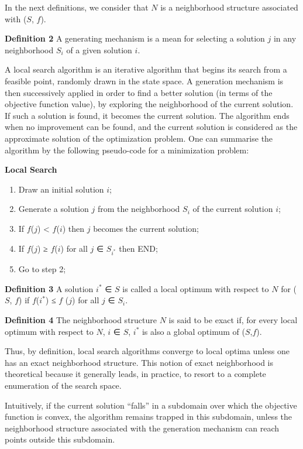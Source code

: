 \documentclass[conference]{IEEEtran}
\begin{document}
In the next definitions, we consider that $N$ is a neighborhood structure associated with ($S$, $f$).

\textbf{Definition 2} A generating mechanism is a mean for selecting a solution $j$ in any neighborhood $S_{i}$ of a given solution $i$.

A local search algorithm is an iterative algorithm that begins its search from a feasible point, randomly drawn in the state space. A generation mechanism is then successively applied in order to find a better solution (in terms of the objective function value), by exploring the neighborhood of the current solution. If such a solution is found, it becomes the current solution. The algorithm ends when no improvement can be found, and the current solution is considered as the approximate solution of the optimization problem. One can summarise the algorithm by the following pseudo-code for a minimization problem:

\textbf{Local Search}

\begin{enumerate}
\item Draw an initial solution $i$;
\item Generate a solution $j$ from the neighborhood $S_{i}$ of the current solution $i$;
\item If $f$($j$) < $f$($i$) then $j$ becomes the current solution;
\item If $f$($j$) ≥ $f$($i$) for all $j$ ∈ $S_{i^{*}}$ then END;
\item Go to step 2;
\end{enumerate}

\textbf{Definition 3} A solution $i^{*}$ ∈ $S$ is called a local optimum with respect to $N$ for ($S$, $f$) if $f$($i^{*}$) ≤ $f$ ($j$) for all $j$ ∈ $S_{i}$.

\textbf{Definition 4} The neighborhood structure $N$ is said to be exact if, for every local optimum with respect to $N$, $i$ ∈ $S$, $i^{*}$ is also a global optimum of ($S$,$f$).

Thus, by definition, local search algorithms converge to local optima unless one has an exact neighborhood structure. This notion of exact neighborhood is theoretical because it generally leads, in practice, to resort to a complete enumeration of the
search space.

Intuitively, if the current solution “falls” in a subdomain over which the objective function is convex, the algorithm remains trapped in this subdomain, unless the neighborhood structure associated with the generation mechanism can reach points
outside this subdomain.
\end{document}
